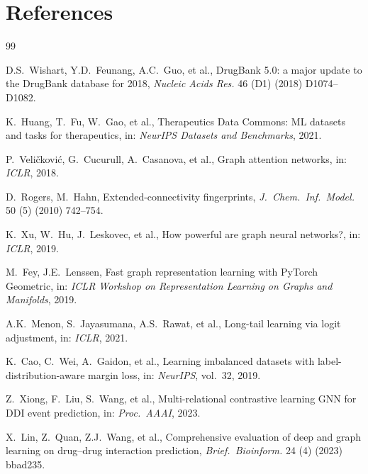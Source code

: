 \documentclass[11pt,a4paper,twocolumn]{article}
\begin{document}

\section*{References}

\begin{thebibliography}{99}
\small
\sloppy
\setlength{\itemsep}{0pt}
\setlength{\parsep}{0pt}
\setlength{\parskip}{0pt}

D.S.\ Wishart, Y.D.\ Feunang, A.C.\ Guo, et al.,
DrugBank 5.0: a major update to the DrugBank database for 2018,
\emph{Nucleic Acids Res.} 46 (D1) (2018) D1074--D1082.

K.\ Huang, T.\ Fu, W.\ Gao, et al.,
Therapeutics Data Commons: ML datasets and tasks for therapeutics,
in: \emph{NeurIPS Datasets and Benchmarks}, 2021.

P.\ Veli\v{c}kovi\'{c}, G.\ Cucurull, A.\ Casanova, et al.,
Graph attention networks,
in: \emph{ICLR}, 2018.

D.\ Rogers, M.\ Hahn,
Extended-connectivity fingerprints,
\emph{J.\ Chem.\ Inf.\ Model.} 50 (5) (2010) 742--754.

K.\ Xu, W.\ Hu, J.\ Leskovec, et al.,
How powerful are graph neural networks?,
in: \emph{ICLR}, 2019.

M.\ Fey, J.E.\ Lenssen,
Fast graph representation learning with PyTorch Geometric,
in: \emph{ICLR Workshop on Representation Learning on Graphs and Manifolds}, 2019.

A.K.\ Menon, S.\ Jayasumana, A.S.\ Rawat, et al.,
Long-tail learning via logit adjustment,
in: \emph{ICLR}, 2021.

K.\ Cao, C.\ Wei, A.\ Gaidon, et al.,
Learning imbalanced datasets with label-distribution-aware margin loss,
in: \emph{NeurIPS}, vol.\ 32, 2019.

Z.\ Xiong, F.\ Liu, S.\ Wang, et al.,
Multi-relational contrastive learning GNN for DDI event prediction,
in: \emph{Proc.\ AAAI}, 2023.

X.\ Lin, Z.\ Quan, Z.J.\ Wang, et al.,
Comprehensive evaluation of deep and graph learning on drug--drug interaction prediction,
\emph{Brief.\ Bioinform.} 24 (4) (2023) bbad235.


\end{thebibliography}
\end{document}
